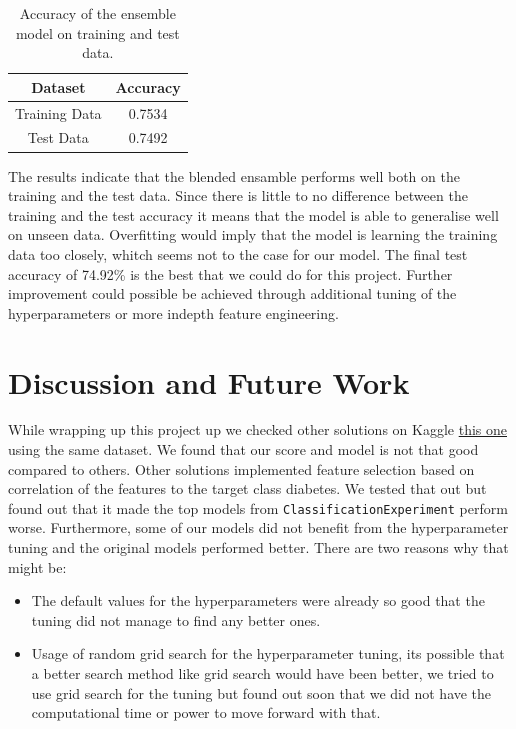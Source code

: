 \documentclass[a4paper,12pt]{article}
\begin{document}
\begin{table}[h]
    \centering
    \begin{tabular}{|c|c|}
        \hline
        \textbf{Dataset} & \textbf{Accuracy} \\
        \hline
        Training Data & 0.7534 \\
        Test Data & 0.7492 \\
        \hline
    \end{tabular}
    \caption{Accuracy of the ensemble model on training and test data.}
    \label{tab:accuracy_results}
\end{table}

The results indicate that the blended ensamble performs well both on the training and the test data. Since there is little to 
no difference between the training and the test accuracy it means that the model is able to generalise well on unseen data. 
Overfitting would imply that the model is learning the training data too closely, whitch seems not to the case for our model.
The final test accuracy of 74.92\% is the best that we could do for this project. 
Further improvement could possible be achieved through additional tuning of the hyperparameters or more indepth feature engineering.


\section{Discussion and Future Work}
While wrapping up this project up we checked other solutions on Kaggle \href{https://www.kaggle.com/code/solafajobi/diabetes-perfect-prediction}{this one} using the same dataset. 
We found that our score and model is not that good compared to others.
Other solutions implemented feature selection based on correlation of the features to the target class diabetes. 
We tested that out but found out that it made the top models from \texttt{ClassificationExperiment} perform worse.
Furthermore, some of our models did not benefit from the hyperparameter tuning and the original models performed better.
There are two reasons why that might be:
    \begin{itemize}
        \item The default values for the hyperparameters were already so good that the tuning did not manage to find any better ones.
        \item Usage of random grid search for the hyperparameter tuning, its possible that a better search method like grid search would have been better, 
        we tried to use grid search for the tuning but found out soon that we did not have the computational time or power to move forward with that. 
    \end{itemize}
\end{document}
